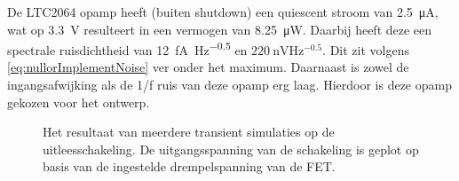 De LTC2064 opamp heeft (buiten shutdown) een quiescent stroom van \qty{2.5}{\micro\ampere}, wat op \qty{3.3}{\volt} resulteert in een vermogen van \qty{8.25}{\micro\watt}. Daarbij heeft deze een spectrale ruisdichtheid van \qty{12}{\femto\ampere\hertz^{-0.5}} en $\qty{220}{\nano\volt\hertz^{-0.5}}$\cite{LTC2064}. Dit zit volgens \cref{eq:nullorImplementNoise} ver onder het maximum. Daarnaast is zowel de ingangsafwijking als de 1/f ruis van deze opamp erg laag. Hierdoor is deze opamp gekozen voor het ontwerp.


\begin{figure}[!htbp]
    \centering
    \pgfplotsset{width=0.7\textwidth}
    
    \caption{Het resultaat van meerdere transient simulaties op de uitleesschakeling. De uitgangsspanning van de schakeling is geplot op basis van de ingestelde drempelspanning van de FET.}
    \label{fig:readoutSimTrans}
\end{figure}